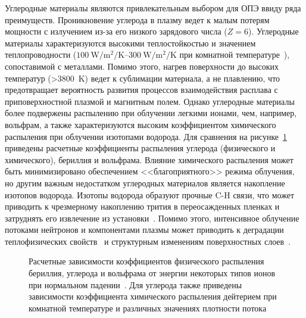 Углеродные материалы являются привлекательным выбором для ОПЭ ввиду ряда преимуществ. Проникновение углерода в плазму ведет к малым потерям мощности с излучением из-за его низкого зарядового числа ($Z=6$). Углеродные материалы характеризуются высокими теплостойкостью и значением теплопроводности ($\SIrange{100}{300}{\watt\per\meter\squared\per\kelvin}$ при комнатной температуре~\cite{Merola2004, Begrambekov2023}), сопоставимой с металлами. Помимо этого, нагрев поверхности до высоких температур (>\SI{3800}{\kelvin}) ведет к сублимации материала, а не плавлению, что предотвращает вероятность развития процессов взаимодействия расплава с приповерхностной плазмой и магнитным полем. Однако углеродные материалы более подвержены распылению при облучении легкими ионами, чем, например, вольфрам, а также характеризуются высоким коэффициентом химического распыления при облучении изотопами водорода. Для сравнения на рисунке~\cref{fig:ch1/sputerring_yields} приведены расчетные коэффициенты распыления углерода (физического и химического), бериллия и вольфрама. Влияние химического распыления может быть минимизировано обеспечением <<благоприятного>> режима облучения, но другим важным недостатком углеродных материалов является накопление изотопов водорода. Изотопы водорода образуют прочные C-H связи, что может приводить к чрезмерному накоплению трития в переосажденных пленках и затруднять его извлечение из установки~\cite{Gasparyan2024}. Помимо этого, интенсивное облучение потоками нейтронов и компонентами плазмы может приводить к деградации теплофизических свойств~\cite{Wu1994} и структурным изменениям поверхностных слоев~\cite{Wang2018,Begrambekov2019,Seyedhabashi2025}.

\begin{figure}[ht]
    \caption{Расчетные зависимости коэффициентов физического распыления бериллия, углерода и вольфрама от энергии некоторых типов ионов при нормальном падении~\cite{international2001iaea, behrisch_2025}. Для углерода также приведены зависимости коэффициента химического распыления дейтерием при комнатной температуре и различных значениях плотности потока~\cite{Roth1999,Roth2004}}\label{fig:ch1/sputerring_yields}
\end{figure}

